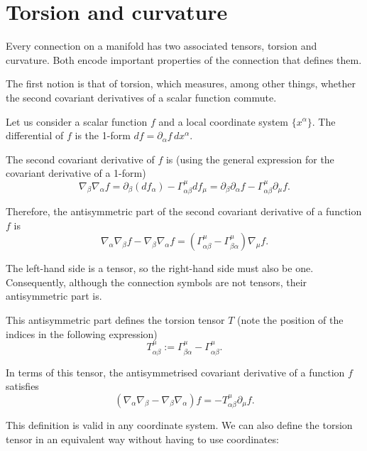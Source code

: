 \section{Torsion and curvature}

\begin{points}
\item Every connection on a manifold has two associated tensors, torsion and curvature. Both encode important properties of the connection that defines them.

\item The first notion is that of torsion, which measures, among other things, whether the second covariant derivatives of a scalar function commute.

\item Let us consider a scalar function $f$ and a local coordinate system $\{x^\alpha\}$. The differential of $f$ is the 1-form $df=\partial_\alpha f\,dx^\alpha$.

\item The second covariant derivative of $f$ is (using the general expression for the covariant derivative of a 1-form)
\[
  \nabla_\beta\nabla_\alpha f=\partial_\beta(df_\alpha)-\Gamma^\mu_{\alpha\beta}df_\mu=\partial_\beta\partial_\alpha f-\Gamma^\mu_{\alpha\beta}\partial_\mu f .
\]

\item Therefore, the antisymmetric part of the second covariant derivative of a function $f$ is
\[
  \nabla_\alpha\nabla_\beta f-\nabla_\beta\nabla_\alpha f=\left(\Gamma^\mu_{\alpha\beta}-\Gamma^\mu_{\beta\alpha}\right)\nabla_\mu f .
\]

\item The left-hand side is a tensor, so the right-hand side must also be one. Consequently, although the connection symbols are not tensors, their antisymmetric part is.

\item This antisymmetric part defines the torsion tensor $T$ (note the position of the indices in the following expression)
\[
  T^\mu_{\alpha\beta}:=\Gamma^\mu_{\beta\alpha}-\Gamma^\mu_{\alpha\beta} .
\]

\item In terms of this tensor, the antisymmetrised covariant derivative of a function $f$ satisfies
\[
  \left(\nabla_\alpha\nabla_\beta-\nabla_\beta\nabla_\alpha\right)f=-T^\mu_{\alpha\beta}\partial_\mu f .
\]

\item This definition is valid in any coordinate system. We can also define the torsion tensor in an equivalent way without having to use coordinates:


\end{points}
